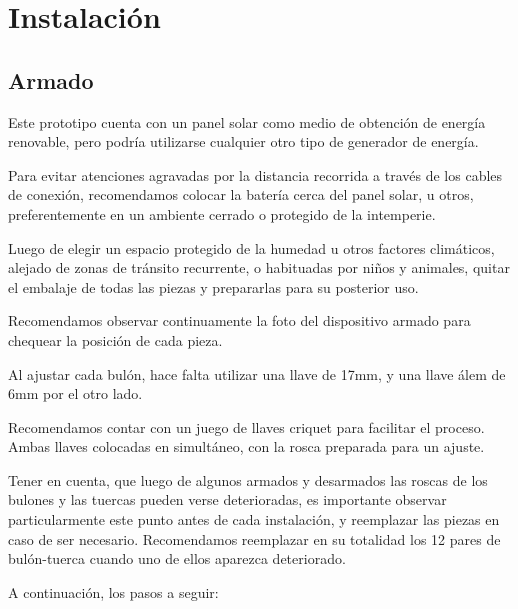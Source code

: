 \chapter{Instalación}
    \section{Armado} 
        Este prototipo cuenta con un panel solar como medio de obtención de energía renovable, pero podría utilizarse cualquier otro tipo de generador de energía.\par
        Para evitar atenciones agravadas por la distancia recorrida a través de los cables de conexión, recomendamos colocar la batería cerca del panel solar, u otros, preferentemente en un ambiente cerrado o protegido de la intemperie.\par
        Luego de elegir un espacio protegido de la humedad u otros factores climáticos, alejado de zonas de tránsito recurrente, o habituadas por niños y animales, quitar el embalaje de todas las piezas y prepararlas para su posterior uso.\par
        Recomendamos observar continuamente la foto del dispositivo armado para chequear la posición de cada pieza.\par
        Al ajustar cada bulón, hace falta utilizar una llave de 17mm, y una llave álem de 6mm por el otro lado.\par
        Recomendamos contar con un juego de llaves criquet para facilitar el proceso. Ambas llaves colocadas en simultáneo, con la rosca preparada para un ajuste.\par
        Tener en cuenta, que luego de algunos armados y desarmados las roscas de los bulones y las tuercas pueden verse deterioradas, es importante observar particularmente este punto antes de cada instalación, y reemplazar las piezas en caso de ser necesario. Recomendamos reemplazar en su totalidad los 12 pares de bulón-tuerca cuando uno de ellos aparezca deteriorado.\par
        A continuación, los pasos a seguir:\par

